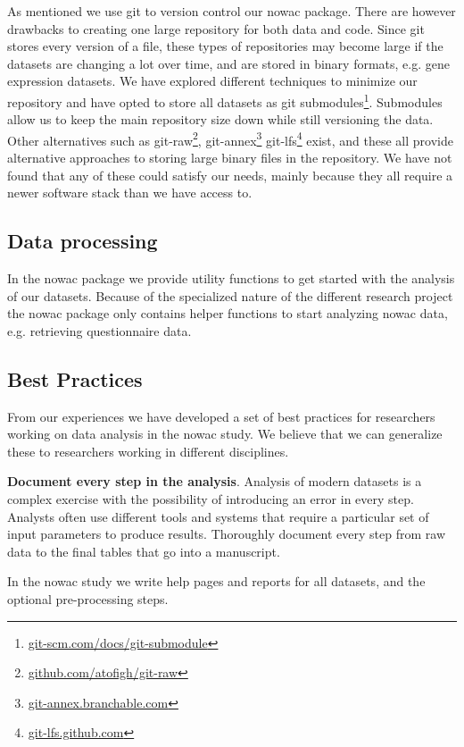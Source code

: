 As mentioned we use git to version control our \gls{nowac} package. There are
however drawbacks to creating one large repository for both data and code. Since
git stores every version of a file, these types of repositories may become large
if the datasets are changing a lot over time, and are stored in binary formats,
e.g. gene expression datasets. We have explored different techniques to minimize
our repository and have opted to store all datasets as git
submodules\footnote{\url{git-scm.com/docs/git-submodule}}. Submodules allow us
to keep the main repository size down while still versioning the data. Other
alternatives such as git-raw\footnote{\url{github.com/atofigh/git-raw}},
git-annex\footnote{\url{git-annex.branchable.com}} 
git-lfs\footnote{\url{git-lfs.github.com}} exist, and these all provide
alternative approaches to storing large binary files in the repository. We have
not found that any of these could satisfy our needs, mainly because they all
require a newer software stack than we have access to.

\subsection{Data processing} 
In the \gls{nowac} package we provide utility functions to get started with the
analysis of our datasets. Because of the specialized nature of the different
research project the \gls{nowac} package only contains helper functions to start
analyzing \gls{nowac} data, e.g. retrieving questionnaire data. 

\subsection{Best Practices} 
From our experiences we have developed a set of best practices for researchers
working on data analysis in the \gls{nowac} study. We believe that we can
generalize these to researchers working in different disciplines. 

\textbf{Document every step in the analysis}. Analysis of modern datasets is a
complex exercise with the possibility of introducing an error in every step.
Analysts often use different tools and systems that require a particular set of
input parameters to produce results. Thoroughly document every step from raw
data to the final tables that go into a manuscript.

In the \gls{nowac} study we write help pages and reports for all datasets, and
the optional pre-processing steps. 


